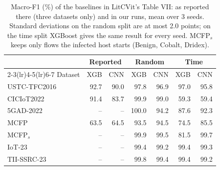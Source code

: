 \begin{table}[t]
\centering
\caption{Macro-F1 (\%) of the baselines in LitCVit's Table VII: as reported there (three datasets only) and in our runs, mean over 3 seeds. Standard deviations on the random split are at most 2.0 points; on the time split XGBoost gives the same result for every seed. MCFP$_{s}$ keeps only flows the infected host starts (Benign, Cobalt, Dridex).}
\label{tab:table7}
\setlength{\tabcolsep}{4pt}
\begin{tabular}{lrrrrrr}
\toprule
 & \multicolumn{2}{c}{Reported} & \multicolumn{2}{c}{Random} & \multicolumn{2}{c}{Time} \\
\cmidrule(lr){2-3}\cmidrule(lr){4-5}\cmidrule(lr){6-7}
Dataset & XGB & CNN & XGB & CNN & XGB & CNN \\
\midrule
USTC-TFC2016 & 92.7 & 90.0 & 97.8 & 96.9 & 97.0 & 95.8 \\
CICIoT2022 & 91.4 & 83.7 & 99.9 & 99.0 & 59.3 & 59.4 \\
5GAD-2022 & -- & -- & 100.0 & 94.2 & 87.6 & 92.3 \\
MCFP & 63.5 & 64.5 & 93.5 & 94.5 & 74.5 & 85.5 \\
MCFP$_{s}$ & -- & -- & 99.9 & 99.5 & 81.5 & 99.7 \\
IoT-23 & -- & -- & 99.4 & 99.2 & 99.4 & 99.3 \\
TII-SSRC-23 & -- & -- & 99.8 & 99.4 & 99.4 & 99.2 \\
\bottomrule
\end{tabular}
\end{table}
